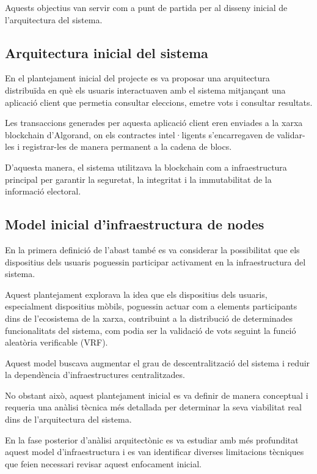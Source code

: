 \documentclass[12pt,a4paper]{article}
\begin{document}
Aquests objectius van servir com a punt de partida per al disseny inicial de l'arquitectura del sistema.

\subsection{Arquitectura inicial del sistema}

En el plantejament inicial del projecte es va proposar una arquitectura distribuïda en què els usuaris interactuaven amb el sistema mitjançant una aplicació client que permetia consultar eleccions, emetre vots i consultar resultats.

Les transaccions generades per aquesta aplicació client eren enviades a la xarxa blockchain d'Algorand, on els contractes intel·ligents s'encarregaven de validar-les i registrar-les de manera permanent a la cadena de blocs.

D'aquesta manera, el sistema utilitzava la blockchain com a infraestructura principal per garantir la seguretat, la integritat i la immutabilitat de la informació electoral.

\subsection{Model inicial d'infraestructura de nodes}

En la primera definició de l'abast també es va considerar la possibilitat que els dispositius dels usuaris poguessin participar activament en la infraestructura del sistema.

Aquest plantejament explorava la idea que els dispositius dels usuaris, especialment dispositius mòbils, poguessin actuar com a elements participants dins de l'ecosistema de la xarxa, contribuint a la distribució de determinades funcionalitats del sistema, com podia ser la validació de vots seguint la funció aleatòria verificable (VRF).

Aquest model buscava augmentar el grau de descentralització del sistema i reduir la dependència d'infraestructures centralitzades.

No obstant això, aquest plantejament inicial es va definir de manera conceptual i requeria una anàlisi tècnica més detallada per determinar la seva viabilitat real dins de l'arquitectura del sistema.

En la fase posterior d'anàlisi arquitectònic es va estudiar amb més profunditat aquest model d'infraestructura i es van identificar diverses limitacions tècniques que feien necessari revisar aquest enfocament inicial.
\end{document}
